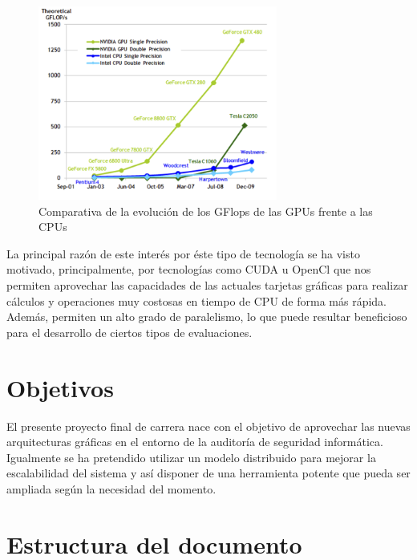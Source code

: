 \begin{figure}
	\centering
	\includegraphics[width=0.7\textwidth]{evolucion-gpu.png}
	\caption{Comparativa de la evolución de los GFlops de las GPUs frente a las CPUs}\label{fig:GPUvsCPU}
\end{figure}

La principal razón de este interés por éste tipo de tecnología se ha visto motivado, principalmente, por tecnologías como CUDA u OpenCl que nos permiten aprovechar las capacidades de las actuales tarjetas gráficas para realizar cálculos y operaciones muy costosas en tiempo de CPU de forma más rápida. Además, permiten un alto grado de paralelismo, lo que puede resultar beneficioso para el desarrollo de ciertos tipos de evaluaciones.

\section{Objetivos}
El presente proyecto final de carrera nace con el objetivo de aprovechar las nuevas arquitecturas gráficas en el entorno de la auditoría de seguridad informática. Igualmente se ha pretendido utilizar un modelo distribuido para mejorar la escalabilidad del sistema y así disponer de una herramienta potente que pueda ser ampliada según la necesidad del momento.

\section{Estructura del documento}

